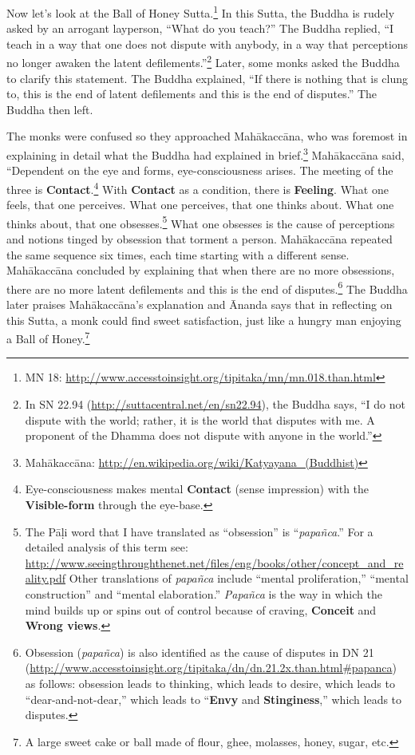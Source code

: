 Now let’s look at the Ball of Honey Sutta.\footnote{MN 18: \url{http://www.accesstoinsight.org/tipitaka/mn/mn.018.than.html}} In this Sutta, the Buddha is rudely asked by an arrogant layperson, “What do you teach?” The Buddha replied, “I teach in a way that one does not dispute with anybody, in a way that perceptions no longer awaken the latent defilements.”\footnote{In SN 22.94 (\url{http://suttacentral.net/en/sn22.94}), the Buddha says, “I do not dispute with the world; rather, it is the world that disputes with me. A proponent of the Dhamma does not dispute with anyone in the world.”} Later, some monks asked the Buddha to clarify this statement. The Buddha explained, “If there is nothing that is clung to, this is the end of latent defilements and this is the end of disputes.” The Buddha then left. 

The monks were confused so they approached Mahākaccāna, who was foremost in explaining in detail what the Buddha had explained in brief.\footnote{Mahākaccāna: \url{http://en.wikipedia.org/wiki/Katyayana_(Buddhist)}} Mahākaccāna said, “Dependent on the eye and forms, eye-consciousness arises. The meeting of the three is \textbf{Contact}.\footnote{Eye-consciousness makes mental \textbf{Contact} (sense impression) with the \textbf{Visible-form} through the eye-base.} With \textbf{Contact} as a condition, there is \textbf{Feeling}. What one feels, that one perceives. What one perceives, that one thinks about. What one thinks about, that one obsesses.\footnote{The Pāḷi word that I have translated as “obsession” is “\textit{papañca}.” For a detailed analysis of this term see: \url{http://www.seeingthroughthenet.net/files/eng/books/other/concept_and_reality.pdf} Other translations of \textit{papañca} include “mental proliferation,” “mental construction” and “mental elaboration.” \textit{Papañca} is the way in which the mind builds up or spins out of control because of craving, \textbf{Conceit} and \textbf{Wrong views}.} What one obsesses is the cause of perceptions and notions tinged by obsession that torment a person. Mahākaccāna repeated the same sequence six times, each time starting with a different sense. Mahākaccāna concluded by explaining that when there are no more obsessions, there are no more latent defilements and this is the end of disputes.\footnote{Obsession (\textit{papañca}) is also identified as the cause of disputes in DN 21 (\url{http://www.accesstoinsight.org/tipitaka/dn/dn.21.2x.than.html\#papanca}) as follows: obsession leads to thinking, which leads to desire, which leads to “dear-and-not-dear,” which leads to “\textbf{Envy} and \textbf{Stinginess},” which leads to disputes.} The Buddha later praises Mahākaccāna’s explanation and Ānanda says that in reflecting on this Sutta, a monk could find sweet satisfaction, just like a hungry man enjoying a Ball of Honey.\footnote{A large sweet cake or ball made of flour, ghee, molasses, honey, sugar, etc.}

